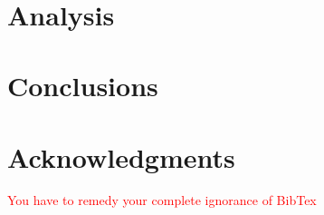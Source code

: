 \documentclass[12pt]{article}
\begin{document}
\


\section{Analysis}




\section{Conclusions}


\section{Acknowledgments}

\textcolor{red}{You have to remedy your complete ignorance of BibTex}
\end{document}
